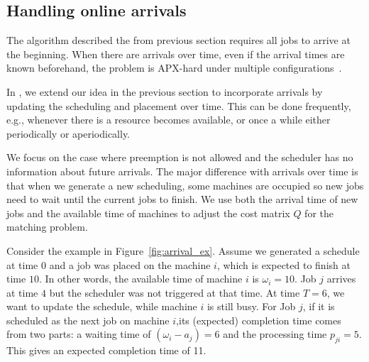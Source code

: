 \subsection{Handling online arrivals}
The algorithm described the from previous section requires all jobs to arrive at the beginning. When there are arrivals over time, even if the arrival times are known beforehand, the problem is APX-hard under multiple configurations~\cite{hoogeveen1998non}.



In \name, we extend our idea in the previous section to incorporate arrivals by updating the scheduling and placement over time. This can be done frequently, e.g., whenever there is a resource becomes available, or once a while either periodically or aperiodically.  

We focus on the case where preemption is not allowed and the scheduler has no information about future arrivals. The major difference with arrivals over time is that when we generate a new scheduling, some machines are occupied so new jobs need to wait until the current jobs to finish. We use both the arrival time of new jobs and the available time of machines to adjust the cost matrix $Q$ for the matching problem. 




Consider the example in Figure~\ref{fig:arrival_ex}. Assume we generated a schedule at time $0$ and a job was placed on the machine $i$, which is expected to finish at time $10$. In other words, the available time of machine $i$ is $\omega_i = 10$. 
Job $j$ arrives at time $4$ but the scheduler was not triggered at that time. 
At time $T=6$, we want to update the schedule, while machine $i$ is still busy. 
For Job $j$, if it is scheduled as the next job on machine $i$,its (expected) completion time comes from two parts: a waiting time of $(\omega_i - a_j)=6$ and the processing time $p_{ji}=5$. This gives an expected completion time of 11. 






